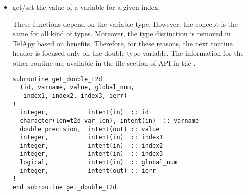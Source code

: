 \begin{itemize}
\begin{lstlisting}
subroutine get_var_size_t2d(id, varname,
                            dim1, dim2, dim3, ierr)
!
  integer,               intent(in) :: id
  character(len=t2d_var_len), intent(in)  :: varname
  integer,               intent(out) :: dim1
  integer,               intent(out) :: dim2
  integer,               intent(out) :: dim3
  integer,               intent(out) :: ierr
!
end subroutine get_var_size_t2d
\end{lstlisting}
%
\begin{itemize}
\item \textbf{id}: The id of the instance.  
\item \textbf{varname}: The name of the variable.
\item \textbf{dim1}: Size of the first dimension.
\item \textbf{dim2}: Size of the second dimension.
\item \textbf{dim3}: Size of the third dimension.
\item \textbf{ierr}: 0 if everything went smoothly, an error index otherwise.
\end{itemize}
%
\begin{CommentBlock}{Comment:}
\centering
If the desired variable is a scalar then, it has no first, second or third
dimension and \verb!dim1!, \verb! dim2!, \verb! dim3! are equal to zero.
\end{CommentBlock}

\item get/set the value of a variable for a given index.

These functions depend on the variable type. However, the concept is the same
for all kind of types. Moreover, the type distinction is removed in TelApy based
on \python benefits. Therefore, for these reasons, the next routine header is
focused only on the double type variable. The information for the other routine
are available in the \fortran file section of API in the \telemacsystem.

\begin{lstlisting}
subroutine get_double_t2d
  (id, varname, value, global_num,
   index1, index2, index3, ierr)
!
  integer,           intent(in)  :: id
  character(len=t2d_var_len), intent(in)  :: varname
  double precision,  intent(out) :: value
  integer,           intent(in)  :: index1
  integer,           intent(in)  :: index2
  integer,           intent(in)  :: index3
  logical,           intent(in)  :: global_num
  integer,           intent(out) :: ierr
!
end subroutine get_double_t2d
\end{lstlisting}


\end{itemize}
